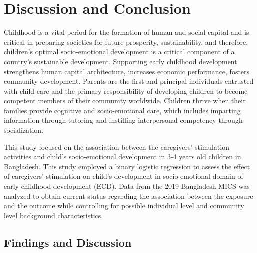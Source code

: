 \documentclass[
  12pt,
  oneside]{report}
\begin{document}
\newpage

\hypertarget{discussion-and-conclusion}{%
\chapter{Discussion and Conclusion}\label{discussion-and-conclusion}}

Childhood is a vital period for the formation of human and social capital and is critical in preparing societies for future prosperity, sustainability, and therefore, children's optimal socio-emotional development is a critical component of a country's sustainable development. Supporting early childhood development strengthens human capital architecture, increases economic performance, fosters community development. Parents are the first and principal individuals entrusted with child care and the primary responsibility of developing children to become competent members of their community worldwide. Children thrive when their families provide cognitive and socio-emotional care, which includes imparting information through tutoring and instilling interpersonal competency through socialization.

This study focused on the association between the caregivers' stimulation activities and child's socio-emotional development in 3-4 years old children in Bangladesh. This study employed a binary logistic regression to assess the effect of caregivers' stimulation on child's development in socio-emotional domain of early childhood development (ECD). Data from the 2019 Bangladesh MICS was analyzed to obtain current status regarding the association between the exposure and the outcome while controlling for possible individual level and community level background characteristics.

\hypertarget{findings-and-discussion}{%
\section{Findings and Discussion}\label{findings-and-discussion}}
\end{document}
